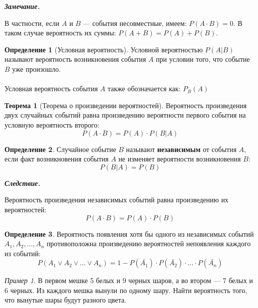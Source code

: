 \documentclass[12pt,a4paper]{article}
\theoremstyle{definition}
\newtheorem{definition}{Определение}[section]
\theoremstyle{definition}
\newtheorem{theorem}{Теорема}[section]
\theoremstyle{remark}
\newenvironment{remark}{
  \par\noindent\textbf{\textit{Замечание.}}~
}{\par}
\theoremstyle{corollary}
\newenvironment{corollary}{
  \par\noindent\textbf{\textit{Следствие.}}~
}{\par}
\theoremstyle{bolditalic}
\newtheorem{example}{Пример}[section]
\begin{document}
\begin{remark}
    В частности, если $A$ и $B$ --- события несовместные, имеем: $P(A\cdot B) =0$. В таком случае вероятность их суммы: $P(A+B)=P(A)+P(B)$.
\end{remark}

\begin{definition}[Условная вероятность]
    Условной вероятностью $P(A|B)$ называют вероятность возникновения события $A$ при условии того, что событие $B$ уже произошло.\\\\
    Условная вероятность события $A$ также обозначается как: $P_B(A)$
\end{definition}

\begin{theorem}[Теорема о произведении вероятностей]
    Вероятность произведения двух случайных событий равна произведению вероятности первого события на условную вероятность второго:
    \[
    P(A\cdot B)=P(A)\cdot P(B|A)
    \]
\end{theorem}

\begin{definition}
    Случайное событие $B$ называют \textbf{независимым} от события $A$, если факт возникновения события $A$ не изменяет вероятности возникновения $B$:
    \[
    P(B|A)=P(B)
    \]
\end{definition}

\begin{corollary}
    Вероятность произведения независимых событий равна произведению их вероятностей:
    \[
    P(A\cdot B) = P(A) \cdot P(B)
    \]
\end{corollary}

\begin{definition}
    Вероятность появления хотя бы одного из независимых событий $A_1, A_2, ..., A_n$ противоположна произведению вероятностей непоявления каждого из событий:
    \[
    P(A_1 \lor A_2 \lor ... \lor A_n)=1-P(\bar{A_1})\cdot P(\bar{A_2})\cdot ... \cdot P(\bar{A_n})
    \]
\end{definition}

\begin{example}
    В первом мешке 5 белых и 9 черных шаров, а во втором --- 7 белых и 6 черных. Из каждого мешка вынули по одному шару.  Найти вероятность того, что вынутые шары будут разного цвета.
\end{example}
\end{document}
